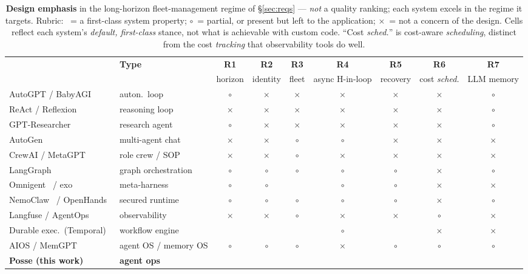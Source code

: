 \documentclass[10pt,twocolumn]{article}
\newcommand{\yes}{{\color{posseNavy}\checkmark}}
\newcommand{\prt}{{\color{posseSlate}$\circ$}}
\newcommand{\no}{{\color{gray}\footnotesize$\times$}}
\begin{document}
\begin{table}[t]
\centering
\caption{\textbf{Design emphasis} in the long-horizon fleet-management regime of
\S\ref{sec:reqs} --- \emph{not} a quality ranking; each system excels in the regime it
targets. Rubric: \yes\ = a first-class system property; \prt\ = partial, or present but
left to the application; \no\ = not a concern of the design. Cells reflect each system's
\emph{default, first-class} stance, not what is achievable with custom code. ``Cost
\emph{sched.}'' is cost-aware \emph{scheduling}, distinct from the cost \emph{tracking}
that observability tools do well.}
\label{tab:compare}
\small
\renewcommand{\arraystretch}{1.15}
\setlength{\tabcolsep}{2.5pt}
\begin{tabular}{@{}l l ccccccc@{}}
\toprule
 & \textbf{Type} & \textbf{R1} & \textbf{R2} & \textbf{R3} & \textbf{R4} & \textbf{R5} & \textbf{R6} & \textbf{R7}\\
 & & \scriptsize horizon & \scriptsize identity & \scriptsize fleet & \scriptsize async H-in-loop & \scriptsize recovery & \scriptsize cost \emph{sched.} & \scriptsize LLM memory\\
\midrule
AutoGPT / BabyAGI~\cite{autogpt,babyagi}      & auton.\ loop         & \prt & \no  & \no  & \no  & \no  & \no  & \prt \\
ReAct / Reflexion~\cite{react,reflexion}      & reasoning loop       & \no  & \no  & \no  & \no  & \no  & \no  & \prt \\
GPT-Researcher~\cite{gptresearcher}           & research agent       & \prt & \no  & \no  & \no  & \no  & \no  & \prt \\
AutoGen~\cite{autogen}                        & multi-agent chat     & \no  & \no  & \prt & \prt & \no  & \no  & \no  \\
CrewAI / MetaGPT~\cite{crewai,metagpt}        & role crew / SOP      & \no  & \no  & \prt & \no  & \no  & \no  & \no  \\
LangGraph~\cite{langgraph}                    & graph orchestration  & \prt & \prt & \prt & \prt & \prt & \no  & \prt \\
Omnigent~\cite{omnigent} / exo~\cite{exo}     & meta-harness         & \prt & \prt & \yes & \prt & \prt & \no  & \no  \\
NemoClaw~\cite{nemoclaw} / OpenHands~\cite{openhands} & secured runtime & \prt & \prt & \prt & \prt & \prt & \no  & \prt \\
Langfuse / AgentOps~\cite{langfuse,agentops}  & observability        & \no  & \no  & \prt & \no  & \no  & \prt & \no  \\
Durable exec.\ (Temporal)~\cite{temporal,stepfns} & workflow engine  & \yes & \yes & \yes & \prt & \yes & \no  & \no  \\
AIOS / MemGPT~\cite{aios,memgpt}              & agent OS / memory OS  & \prt & \prt & \prt & \no  & \prt & \prt & \prt \\
\midrule
\textbf{Posse (this work)}                    & \textbf{agent ops}   & \yes & \yes & \yes & \yes & \yes & \yes & \yes \\
\bottomrule
\end{tabular}
\end{table}
\end{document}
